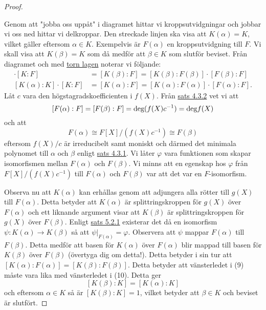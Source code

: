 \documentclass{article}
\newcommand{\grad}[0]{\textnormal{deg}}
\theoremstyle{definition}
\begin{document}
\begin{proof}
\begin{center}
  \end{center}
  Genom att "jobba oss uppåt" i diagramet hittar vi kroppsutvidgningar och jobbar vi oss ned hittar vi delkroppar. 
  Den streckade linjen ska visa att $K(\alpha) = K$, vilket gäller eftersom $\alpha \in K.$
  Exempelvis är $F(\alpha)$ en kroppsutvidgning 
  till $F$. Vi skall visa att $K(\beta) = K$ som då medför att $\beta \in K$ som slutför beviset. Från diagramet och med \hyperlink{torn lagen}{torn lagen}
  noterar vi följande:
  \begin{align}
    [K(\beta): K] \cdot [K:F] &= [K(\beta): F] = [K(\beta): F(\beta)] \cdot [F(\beta): F] \\
    [K(\alpha): K] \cdot [K:F] &= [K(\alpha): F] = [K(\alpha): F(\alpha)] \cdot [F(\alpha): F].
  \end{align}
  Låt $c$ vara den högstagradskoefficienten i $f(X)$. Från \hyperlink{5.3.2}{sats 4.3.2} vet vi att
  \[[F(\alpha): F] = [F(\beta):F] = \grad (f(X)c^{-1}) = \grad f(X)\]
  och att
  \[F(\alpha) \cong F[X]/(f(X)c^{-1}) \cong F(\beta)\]
  eftersom $f(X)/c$ är irreducibelt samt moniskt 
  och därmed det minimala polynomet till $\alpha$ och $\beta$ enligt \hyperlink{minpol}{sats 4.3.1}. Vi låter 
  $\varphi$ vara funktionen som skapar isomorfismen mellan $F(\alpha)$ och $F(\beta)$. 
  Vi minns att en egenskap hos $\varphi$ från $F[X]/(f(X)c^{-1})$ till $F(\alpha)$ och $F(\beta)$
  var att det var en $F$-isomorfism.

  Observa nu att $K(\alpha)$ kan erhållas genom att adjungera alla rötter till $g(X)$ till $F(\alpha)$. Detta betyder att 
  $K(\alpha)$ är splittringskroppen för $g(X)$ över $F(\alpha)$ och ett liknande argument visar att $K(\beta)$ är splittringskroppen för 
  $g(X)$ över $F(\beta)$. Enligt \hyperlink{sats6.0.1}{sats 5.2.1} existerar det då en isomorfism $\psi: K(\alpha) \rightarrow K(\beta)$ 
  så att $\psi |_{F(\alpha)} = \varphi$. Observera att $\psi$ mappar $F(\alpha)$ till $F(\beta)$. Detta medför att basen för $K(\alpha)$
  över $F(\alpha)$ blir mappad till basen för $K(\beta)$ över $F(\beta)$ (övertyga dig om detta!). Detta betyder i sin tur att 
  $[K(\alpha):F(\alpha)] = [K(\beta): F(\beta)]$. Detta betyder att vänsterledet i (9) måste vara lika med vänsterledet i (10). Detta ger 
  \[[K(\beta): K] = [K(\alpha):K]\]
  och eftersom $\alpha \in K$ så är $[K(\beta):K] = 1$, vilket betyder att $\beta \in K$ och beviset är slutfört. 
\end{proof}
\end{document}
